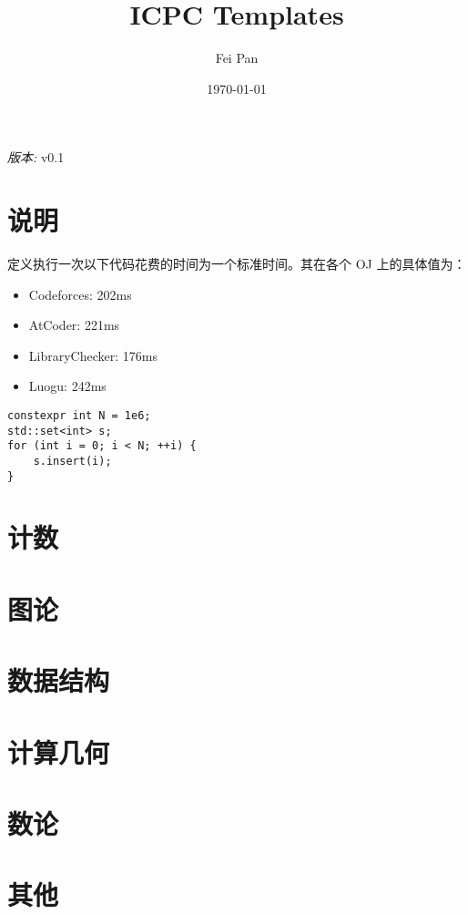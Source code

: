 \documentclass[12pt]{ctexart}
\title{ICPC Templates}
\date{\today}
\author{Fei Pan}
\newcommand{\version}{v0.1}
\begin{document}
\maketitle
\begin{center}
    \textit{版本: }\version
\end{center}

\tableofcontents
\newpage

\section{说明}

定义执行一次以下代码花费的时间为一个标准时间。其在各个 OJ 上的具体值为：

\begin{itemize}
\item Codeforces: 202ms
\item AtCoder: 221ms
\item LibraryChecker: 176ms
\item Luogu: 242ms
\end{itemize}
\begin{lstlisting}
constexpr int N = 1e6;
std::set<int> s;
for (int i = 0; i < N; ++i) {
    s.insert(i);
}
\end{lstlisting}
\newpage

\section{计数}



\section{图论}



\section{数据结构}


\section{计算几何}



\section{数论}


\section{其他}


\end{document}
